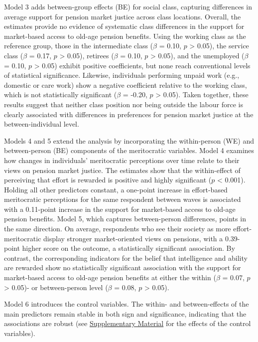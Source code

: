 \documentclass[
  12pt,
]{article}
\begin{document}
Model 3 adds between-group effects (BE) for social class, capturing
differences in average support for pension market justice across class
locations. Overall, the estimates provide no evidence of systematic
class differences in the support for market-based access to old-age
pension benefits. Using the working class as the reference group, those
in the intermediate class (\(\beta\) = 0.10, \(p\) \textgreater{} 0.05),
the service class (\(\beta\) = 0.17, \(p\) \textgreater{} 0.05),
retirees (\(\beta\) = 0.10, \(p\) \textgreater{} 0.05), and the
unemployed (\(\beta\) = 0.10, \(p\) \textgreater{} 0.05) exhibit
positive coefficients, but none reach conventional levels of statistical
significance. Likewise, individuals performing unpaid work (e.g.,
domestic or care work) show a negative coefficient relative to the
working class, which is not statistically significant (\(\beta\) =
-0.20, \(p\) \textgreater{} 0.05). Taken together, these results suggest
that neither class position nor being outside the labour force is
clearly associated with differences in preferences for pension market
justice at the between-individual level.

Models 4 and 5 extend the analysis by incorporating the within-person
(WE) and between-person (BE) components of the meritocratic variables.
Model 4 examines how changes in individuals' meritocratic perceptions
over time relate to their views on pension market justice. The estimates
show that the within-effect of perceiving that effort is rewarded is
positive and highly significant (\(p\) \textless{} 0.001). Holding all
other predictors constant, a one-point increase in effort-based
meritocratic perceptions for the same respondent between waves is
associated with a 0.11-point increase in the support for market-based
access to old-age pension benefits. Model 5, which captures
between-person differences, points in the same direction. On average,
respondents who see their society as more effort-meritocratic display
stronger market-oriented views on pensions, with a 0.39-point higher
score on the outcome, a statistically significant association. By
contrast, the corresponding indicators for the belief that intelligence
and ability are rewarded show no statistically significant association
with the support for market-based access to old-age pension benefits at
either the within (\(\beta\) = 0.07, \(p\) \textgreater{} 0.05)- or
between-person level (\(\beta\) = 0.08, \(p\) \textgreater{} 0.05).

Model 6 introduces the control variables. The within- and
between-effects of the main predictors remain stable in both sign and
significance, indicating that the associations are robust (see
\hyperref[anexo]{Supplementary Material} for the effects of the control
variables).
\end{document}
